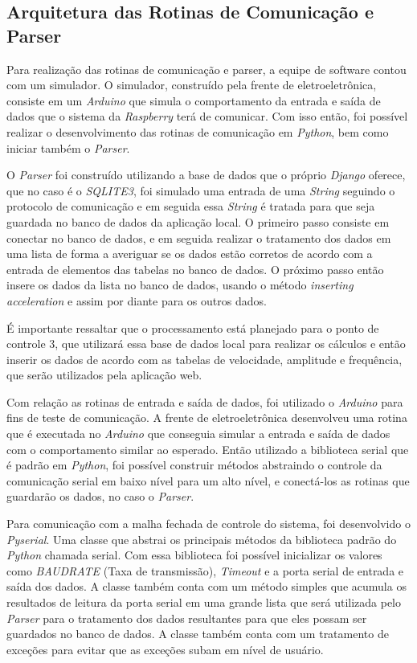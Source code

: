 \subsection*{\textbf{Arquitetura das Rotinas de Comunicação e Parser}}

Para realização das rotinas de comunicação e parser, a equipe de software contou com um simulador. O simulador, construído pela frente de eletroeletrônica, consiste em um \textit{Arduino} que simula o comportamento da entrada e saída de dados que o sistema da \textit{Raspberry} terá de comunicar. Com isso então, foi possível realizar o desenvolvimento das rotinas de comunicação em \textit{Python}, bem como iniciar também o \textit{Parser}.

O \textit{Parser} foi construído utilizando a base de dados que o próprio \textit{Django} oferece, que no caso é o \textit{SQLITE3}, foi simulado uma entrada de uma \textit{String} seguindo o protocolo de comunicação e em seguida essa \textit{String} é tratada para que seja guardada no banco de dados da aplicação local. O primeiro passo consiste em conectar no banco de dados, e em seguida realizar o tratamento dos dados em uma lista de forma a averiguar se os dados estão corretos de acordo com a entrada de elementos das tabelas no banco de dados. O próximo passo então insere os dados da lista no banco de dados, usando o método \textit{inserting acceleration} e assim por diante para os outros dados.

É importante ressaltar que o processamento está planejado para o ponto de controle 3, que utilizará essa base de dados local para realizar os cálculos e então inserir os dados de acordo com as tabelas de velocidade, amplitude e frequência, que serão utilizados pela aplicação web.

Com relação as rotinas de entrada e saída de dados, foi utilizado o \textit{Arduino} para fins de teste de comunicação. A frente de eletroeletrônica desenvolveu uma rotina que é executada no \textit{Arduino} que conseguia simular a entrada e saída de dados com o comportamento similar ao esperado. Então utilizado a biblioteca serial que é padrão em \textit{Python}, foi possível construir métodos abstraindo o controle da comunicação serial em baixo nível para um alto nível, e conectá-los as rotinas que guardarão os dados, no caso o \textit{Parser}.

Para comunicação com a malha fechada de controle do sistema, foi desenvolvido o \textit{Pyserial}. Uma classe que abstrai os principais métodos da biblioteca padrão do \textit{Python} chamada serial. Com essa biblioteca foi possível inicializar os valores como \textit{BAUDRATE} (Taxa de transmissão), \textit{Timeout} e a porta serial de entrada e saída dos dados. A classe também conta com um método simples que acumula os resultados de leitura da porta serial em uma grande lista que será utilizada pelo \textit{Parser} para o tratamento dos dados resultantes para que eles possam ser guardados no banco de dados. A classe também conta com um tratamento de exceções para evitar que as exceções subam em nível de usuário.

